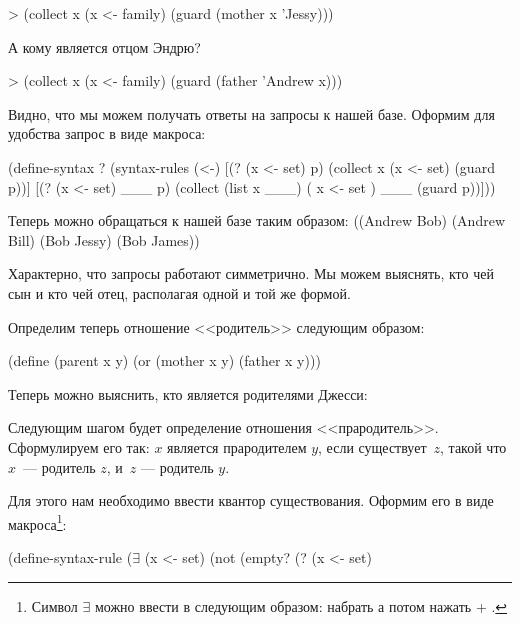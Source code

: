 \begin{SchemeCode}[emph={x}]
   > (collect x
       (x <- family)
       (guard (mother x 'Jessy)))
\end{SchemeCode}

\newpage
А кому является отцом Эндрю?
\begin{SchemeCode}[emph={x}]
   > (collect x 
       (x <- family)
       (guard (father 'Andrew x)))
\end{SchemeCode}

Видно, что мы можем получать ответы на запросы к нашей базе. Оформим для удобства запрос в виде макроса:
  
\begin{Definition}[emph={p,x,set}]
(define-syntax ?
  (syntax-rules (<-)
    [(? (x <- set) p) (collect x (x <- set) (guard p))]
    [(? (x <- set) ___ p) (collect (list x ___)
                            ( x <- set ) ___
                            (guard p))]))
\end{Definition}

Теперь можно обращаться к нашей базе таким образом:
{((Andrew Bob) (Andrew Bill) (Bob Jessy) (Bob James))}

Характерно, что запросы работают симметрично. Мы можем выяснять, кто чей сын и кто чей отец, располагая одной и той же формой.

Определим теперь отношение <<родитель>> следующим образом:
\begin{Definition}[emph={x,y}]
(define (parent x y)
  (or (mother x y)
      (father x y)))
\end{Definition}
Теперь можно выяснить, кто является родителями Джесси:

Следующим шагом будет определение отношения <<прародитель>>. Сформулируем его так: $x$ является прародителем $y$, если существует~$z$, такой что $x$~--- родитель $z$, и~$z$ --- родитель $y$. 

Для этого нам необходимо ввести квантор существования. Оформим его в виде макроса\footnote{Символ $\exists$ можно ввести в  следующим образом: набрать \s{\\exists} а потом нажать  + \s{\\}.}:

\begin{Definition}[emph={x,set,p}]
(define-syntax-rule ($\exists$ (x <- set) %
  (not (empty? (? (x <- set) %
\end{Definition}

